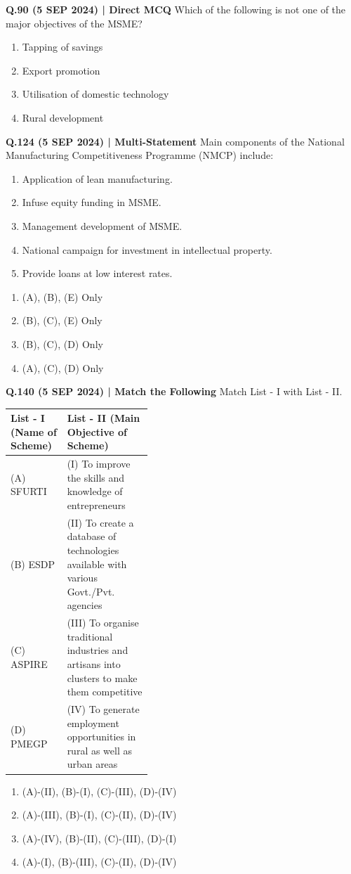 \documentclass{article}
\begin{document}
\textbf{Q.90 (5 SEP 2024) | Direct MCQ}
Which of the following is not one of the major objectives of the MSME?
\begin{enumerate}[label=(\arabic*)]
    \item Tapping of savings
    \item Export promotion
    \item Utilisation of domestic technology
    \item Rural development
\end{enumerate}

\textbf{Q.124 (5 SEP 2024) | Multi-Statement}
Main components of the National Manufacturing Competitiveness Programme (NMCP) include:
\begin{enumerate}[label=\Alph*.]
    \item Application of lean manufacturing.
    \item Infuse equity funding in MSME.
    \item Management development of MSME.
    \item National campaign for investment in intellectual property.
    \item Provide loans at low interest rates.
\end{enumerate}
\begin{enumerate}[label=(\arabic*)]
    \item (A), (B), (E) Only
    \item (B), (C), (E) Only
    \item (B), (C), (D) Only
    \item (A), (C), (D) Only
\end{enumerate}

\textbf{Q.140 (5 SEP 2024) | Match the Following}
Match List - I with List - II.
\begin{tabularx}{\linewidth}{@{} p{0.4\linewidth} X @{}}
    \toprule
    \textbf{List - I (Name of Scheme)} & \textbf{List - II (Main Objective of Scheme)} \\
    \midrule
    (A) SFURTI & (I) To improve the skills and knowledge of entrepreneurs \\
    (B) ESDP & (II) To create a database of technologies available with various Govt./Pvt. agencies \\
    (C) ASPIRE & (III) To organise traditional industries and artisans into clusters to make them competitive \\
    (D) PMEGP & (IV) To generate employment opportunities in rural as well as urban areas \\
    \bottomrule
\end{tabularx}
\begin{enumerate}[label=(\arabic*)]
    \item (A)-(II), (B)-(I), (C)-(III), (D)-(IV)
    \item (A)-(III), (B)-(I), (C)-(II), (D)-(IV)
    \item (A)-(IV), (B)-(II), (C)-(III), (D)-(I)
    \item (A)-(I), (B)-(III), (C)-(II), (D)-(IV)
\end{enumerate}
\end{document}
